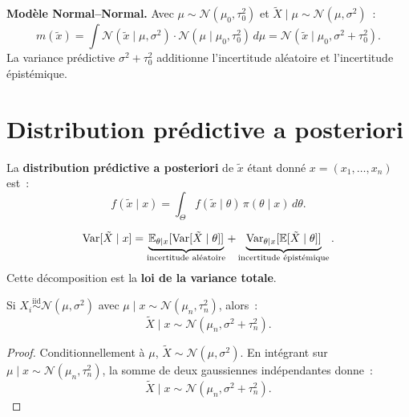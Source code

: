 \begin{exemple}
\textbf{Mod\`ele Normal--Normal.}
Avec $\mu \sim \mathcal{N}(\mu_0, \tau_0^2)$ et
$\tilde{X} \mid \mu \sim \mathcal{N}(\mu, \sigma^2)$~:
\[
  m(\tilde{x}) = \int \mathcal{N}(\tilde{x} \mid \mu, \sigma^2)
  \cdot \mathcal{N}(\mu \mid \mu_0, \tau_0^2)\,d\mu
  = \mathcal{N}(\tilde{x} \mid \mu_0, \sigma^2 + \tau_0^2).
\]
La variance pr\'edictive $\sigma^2 + \tau_0^2$ additionne l'incertitude
al\'eatoire et l'incertitude \'epist\'emique.
\end{exemple}

\section{Distribution pr\'edictive a posteriori}

\begin{definition}
La \textbf{distribution pr\'edictive a posteriori} de $\tilde{x}$
\'etant donn\'e $x = (x_1, \ldots, x_n)$ est~:
\[
  f(\tilde{x} \mid x) = \int_\Theta f(\tilde{x} \mid \theta)\,\pi(\theta \mid x)\,d\theta.
\]
\end{definition}

\begin{formules}[title=\textbf{D\'ecomposition de la variance pr\'edictive}]
\[
  \mathrm{Var}[\tilde{X} \mid x]
  = \underbrace{\mathbb{E}_{\theta \mid x}[\mathrm{Var}[\tilde{X} \mid \theta]]}_{\text{incertitude al\'eatoire}}
  + \underbrace{\mathrm{Var}_{\theta \mid x}[\mathbb{E}[\tilde{X} \mid \theta]]}_{\text{incertitude \'epist\'emique}}.
\]
Cette d\'ecomposition est la \textbf{loi de la variance totale}.
\end{formules}

\begin{theoreme}
Si $X_i \overset{\text{iid}}{\sim} \mathcal{N}(\mu, \sigma^2)$ avec
$\mu \mid x \sim \mathcal{N}(\mu_n, \tau_n^2)$, alors~:
\[
  \tilde{X} \mid x \sim \mathcal{N}(\mu_n, \sigma^2 + \tau_n^2).
\]
\end{theoreme}

\begin{proof}
Conditionnellement \`a $\mu$, $\tilde{X} \sim \mathcal{N}(\mu, \sigma^2)$.
En int\'egrant sur $\mu \mid x \sim \mathcal{N}(\mu_n, \tau_n^2)$,
la somme de deux gaussiennes ind\'ependantes donne~:
\[
  \tilde{X} \mid x \sim \mathcal{N}(\mu_n, \sigma^2 + \tau_n^2).
\]
\end{proof}

